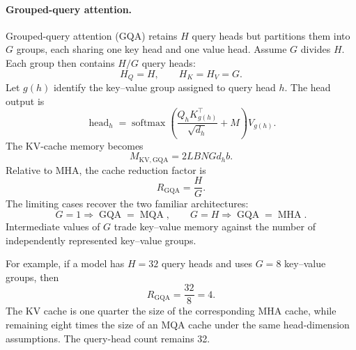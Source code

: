 \paragraph{Grouped-query attention.}
Grouped-query attention (GQA) retains \(H\) query heads but partitions
them into \(G\) groups, each sharing one key head and one value head.
Assume \(G\) divides \(H\). Each group then contains \(H/G\) query heads:
\begin{equation}
    H_Q=H,
    \qquad
    H_K=H_V=G.
    \label{eq:attn-gqa-head-counts}
\end{equation}
Let \(g(h)\) identify the key--value group assigned to query head \(h\).
The head output is
\begin{equation}
    \operatorname{head}_h
    =
    \operatorname{softmax}
    \left(
        \frac{
            Q_hK_{g(h)}^\top
        }{\sqrt{d_h}}+M
    \right)V_{g(h)}.
    \label{eq:attn-gqa-head}
\end{equation}
The KV-cache memory becomes
\begin{equation}
    M_{\mathrm{KV,GQA}}
    =
    2LBNGd_hb.
    \label{eq:attn-gqa-cache}
\end{equation}
Relative to MHA, the cache reduction factor is
\begin{equation}
    R_{\mathrm{GQA}}
    =
    \frac{H}{G}.
    \label{eq:attn-gqa-reduction}
\end{equation}
The limiting cases recover the two familiar architectures:
\begin{equation}
    G=1
    \Longrightarrow
    \operatorname{GQA}=\operatorname{MQA},
    \qquad
    G=H
    \Longrightarrow
    \operatorname{GQA}=\operatorname{MHA}.
    \label{eq:attn-gqa-boundaries}
\end{equation}
Intermediate values of \(G\) trade key--value memory against the number
of independently represented key--value groups.

For example, if a model has \(H=32\) query heads and uses \(G=8\)
key--value groups, then
\begin{equation}
    R_{\mathrm{GQA}}=\frac{32}{8}=4.
    \label{eq:attn-gqa-numerical-example}
\end{equation}
The KV cache is one quarter the size of the corresponding MHA cache,
while remaining eight times the size of an MQA cache under the same
head-dimension assumptions. The query-head count remains 32.

